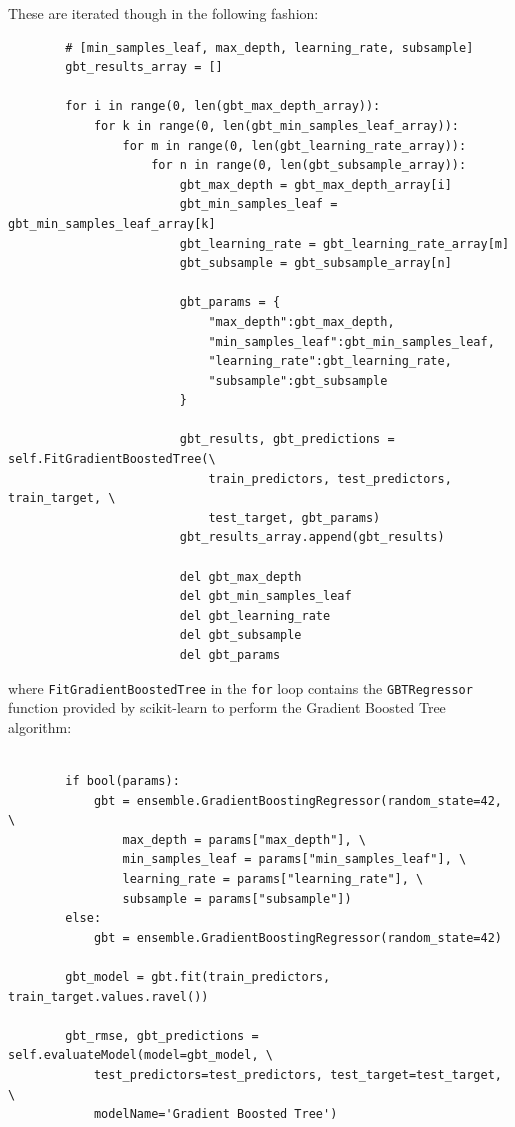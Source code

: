 \documentclass[11pt,a4paper,titlepage]{article}
\begin{document}
These are iterated though in the following fashion:

\begin{verbatim}
        # [min_samples_leaf, max_depth, learning_rate, subsample]
        gbt_results_array = [] 

        for i in range(0, len(gbt_max_depth_array)):
            for k in range(0, len(gbt_min_samples_leaf_array)):
                for m in range(0, len(gbt_learning_rate_array)):
                    for n in range(0, len(gbt_subsample_array)):
                        gbt_max_depth = gbt_max_depth_array[i]
                        gbt_min_samples_leaf = gbt_min_samples_leaf_array[k]
                        gbt_learning_rate = gbt_learning_rate_array[m]
                        gbt_subsample = gbt_subsample_array[n]

                        gbt_params = {
                            "max_depth":gbt_max_depth,
                            "min_samples_leaf":gbt_min_samples_leaf,
                            "learning_rate":gbt_learning_rate,
                            "subsample":gbt_subsample
                        }

                        gbt_results, gbt_predictions = self.FitGradientBoostedTree(\
                            train_predictors, test_predictors, train_target, \
                            test_target, gbt_params)
                        gbt_results_array.append(gbt_results)

                        del gbt_max_depth
                        del gbt_min_samples_leaf
                        del gbt_learning_rate
                        del gbt_subsample
                        del gbt_params
\end{verbatim}

where \texttt{FitGradientBoostedTree} in the \texttt{for} loop contains the \texttt{GBTRegressor} function provided by scikit-learn to perform the Gradient Boosted Tree algorithm:

\begin{verbatim}

        if bool(params):
            gbt = ensemble.GradientBoostingRegressor(random_state=42, \
                max_depth = params["max_depth"], \
                min_samples_leaf = params["min_samples_leaf"], \
                learning_rate = params["learning_rate"], \
                subsample = params["subsample"])
        else:
            gbt = ensemble.GradientBoostingRegressor(random_state=42)

        gbt_model = gbt.fit(train_predictors, train_target.values.ravel())

        gbt_rmse, gbt_predictions = self.evaluateModel(model=gbt_model, \
            test_predictors=test_predictors, test_target=test_target, \
            modelName='Gradient Boosted Tree')
\end{verbatim}
\end{document}

